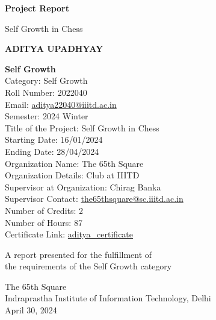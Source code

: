 \documentclass[a4paper,11pt]{article}
\begin{document}
\begin{titlepage}
    \begin{center}
        \vspace*{1cm}
        \Huge
        \textbf{Project Report}

        \vspace{0.5cm}
        \LARGE
        Self Growth in Chess

        \vspace{1.5cm}

        \textbf{ADITYA UPADHYAY}

        \textbf{Self Growth}\\
        Category: Self Growth\\
        Roll Number: 2022040\\
        Email: \href{mailto:aditya22040@iiitd.ac.in}{aditya22040@iiitd.ac.in}\\
        Semester: 2024 Winter\\
        Title of the Project: Self Growth in Chess\\
        Starting Date: 16/01/2024\\
        Ending Date: 28/04/2024\\
        Organization Name: The 65th Square\\
        Organization Details: Club at IIITD\\
        Supervisor at Organization: Chirag Banka\\
        Supervisor Contact: \href{mailto:the65thsquare@sc.iiitd.ac.in}{the65thsquare@sc.iiitd.ac.in}\\
        Number of Credits: 2\\
        Number of Hours: 87\\
        Certificate Link: \href{https://drive.google.com/file/d/1VAABHvdASUJuy2gwAWaEtlJd9aoCkC7B/view?usp=drive_link}{aditya\_certificate}

        \vfill
        
        A report presented for the fulfillment of\\
        the requirements of the Self Growth category
        
        \vspace{0.8cm}
        
        \Large
        The 65th Square\\
        Indraprastha Institute of Information Technology, Delhi\\
        April 30, 2024

    \end{center}
\end{titlepage}
\end{document}
